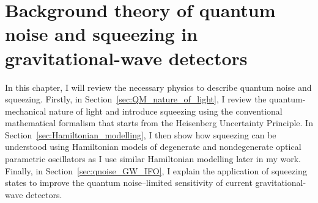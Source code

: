 \chapter{Background theory of quantum noise and squeezing in gravitational-wave detectors} %
\label{chp:background_theory}





In this chapter, I will review the necessary physics to describe quantum noise and squeezing. Firstly, in Section~\ref{sec:QM_nature_of_light}, I review the quantum-mechanical nature of light and introduce squeezing using the conventional mathematical formalism that starts from the Heisenberg Uncertainty Principle. In Section~\ref{sec:Hamiltonian_modelling}, I then show how squeezing can be understood using Hamiltonian models of degenerate and nondegenerate optical parametric oscillators as I use similar Hamiltonian modelling later in my work. %
Finally, in Section~\ref{sec:qnoise_GW_IFO}, I explain the application of squeezing states to improve the quantum noise--limited sensitivity of current gravitational-wave detectors.


